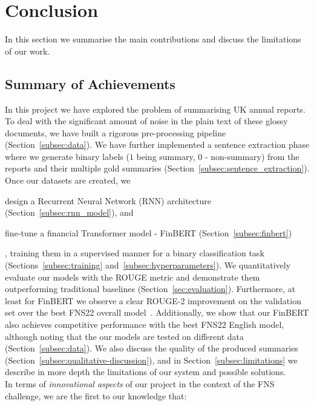 \newpage

\section{Conclusion}\label{sec:conclusion}
In this section we summarise the main contributions and discuss the limitations of our work.

\subsection{Summary of Achievements}\label{subsec:summary}
In this project we have explored the problem of summarising UK annual reports.
To deal with the significant amount of noise in the plain text of these glossy documents, we have built a rigorous pre-processing pipeline (Section~\ref{subsec:data}).
We have further implemented a sentence extraction phase where we generate binary labels ($1$ being summary, $0$ - non-summary) from the reports and their multiple gold summaries (Section~\ref{subsec:sentence_extraction}).
Once our datasets are created, we
\begin{enumerate*}[label=(\alph*)]
    \item design a Recurrent Neural Network (RNN) architecture (Section~\ref{subsec:rnn_model}), and
    \item fine-tune a financial Transformer model - FinBERT (Section~\ref{subsec:finbert})
\end{enumerate*},
training them in a supervised manner for a binary classification task (Sections~\ref{subsec:training} and~\ref{subsec:hyperparameters}).
We quantitatively evaluate our models with the ROUGE metric and demonstrate them outperforming traditional baselines (Section~\ref{sec:evaluation}).
Furthermore, at least for FinBERT we observe a clear ROUGE-2 improvement on the validation set over the best FNS22 overall model~\cite{foroutan-etal-2022-multilingual}.
Additionally, we show that our FinBERT also achieves competitive performance with the best FNS22 English model,
although noting that the our models are tested on different data (Section~\ref{subsec:data}).
We also discuss the quality of the produced summaries (Section~\ref{subsec:qualitative-discussion}), and in
Section~\ref{subsec:limitations} we describe in more depth the limitations of our system and possible solutions.
\\
In terms of \emph{innovational aspects} of our project in the context of the FNS challenge, we are the first to our knowledge that:
